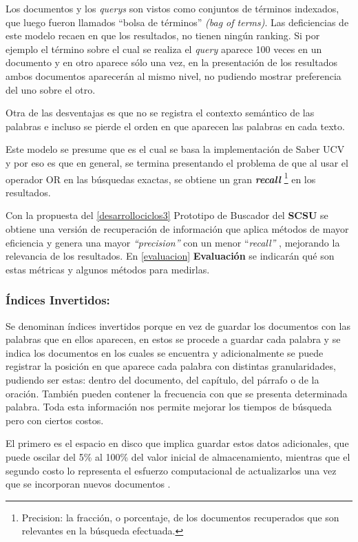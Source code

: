 \documentclass[
  10,
  openany]{book}
\begin{document}
Los documentos y los \emph{querys} son vistos como conjuntos de términos indexados, que luego fueron llamados ``bolsa de términos'' \emph{(bag of terms)}. Las deficiencias de este modelo recaen en que los resultados, no tienen ningún ranking. Si por ejemplo el término sobre el cual se realiza el \emph{query} aparece 100 veces en un documento y en otro aparece sólo una vez, en la presentación de los resultados ambos documentos aparecerán al mismo nivel, no pudiendo mostrar preferencia del uno sobre el otro.

Otra de las desventajas es que no se registra el contexto semántico de las palabras e incluso se pierde el orden en que aparecen las palabras en cada texto.

Este modelo se presume que es el cual se basa la implementación de Saber UCV y por eso es que en general, se termina presentando el problema de que al usar el operador OR en las búsquedas exactas, se obtiene un gran \textbf{\emph{recall}} \footnote{Precision: la fracción, o porcentaje, de los documentos recuperados que son relevantes en la búsqueda efectuada.} en los resultados.

Con la propuesta del \ref{desarrollociclos3} Prototipo de Buscador del \textbf{SCSU} se obtiene una versión de recuperación de información que aplica métodos de mayor eficiencia y genera una mayor \emph{``precision''} con un menor ``\emph{recall''} , mejorando la relevancia de los resultados. En \ref{evaluacion} \textbf{Evaluación} se indicarán qué son estas métricas y algunos métodos para medirlas.

\hypertarget{invind}{%
\subsubsection{Índices Invertidos:}\label{invind}}

Se denominan índices invertidos porque en vez de guardar los documentos con las palabras que en ellos aparecen, en estos se procede a guardar cada palabra y se indica los documentos en los cuales se encuentra y adicionalmente se puede registrar la posición en que aparece cada palabra con distintas granularidades, pudiendo ser estas: dentro del documento, del capítulo, del párrafo o de la oración. También pueden contener la frecuencia con que se presenta determinada palabra. Toda esta información nos permite mejorar los tiempos de búsqueda pero con ciertos costos.

El primero es el espacio en disco que implica guardar estos datos adicionales, que puede oscilar del 5\% al 100\% del valor inicial de almacenamiento, mientras que el segundo costo lo representa el esfuerzo computacional de actualizarlos una vez que se incorporan nuevos documentos \citep{Mahapatra2011}.
\end{document}
